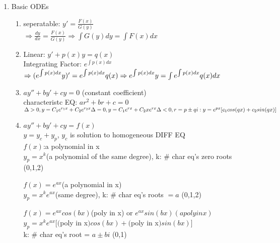 \documentclass[10pt]{article}
\begin{document}
  
\begin{multicols}{2}
	
\begin{enumerate}
	\item Basic ODEs
	\begin{enumerate}
		\item seperatable: $y'= \frac{F(x)}{G(y)}$\\
		$\Rightarrow \frac{dy}{dx} = \frac{F(x)}{G(y)} \Rightarrow \int G(y)dy = \int F(x)dx$
		
		\item Linear: $y'+p(x)y = q(x)$\\
		Integrating Factor: $e^{\int p(x)dx}$\\
		$\Rightarrow (e^{\int p(x)dx}y)' = e^{\int p(x)dx}q(x)\\ \Rightarrow
		e^{\int p(x)dx}y = \int e^{\int p(x)dx}q(x)dx$
		
		\item $ay'' + by' + cy = 0$ (constant coefficient)\\
		characteristc EQ: $ar^2 + br + c = 0$\\
		$\Delta > 0, y = C_1e^{r_1x} + C_2e^{r_2x}\\
		\Delta = 0, y = C_1e^{rx} + C_2xe^{rx}\\
		\Delta < 0, r = p \pm qi: y = e^{px}[c_1cos(qx)+c_2sin(qx)]$
		
		\item $ay'' + by' + cy = f(x)$ \\
		$y = y_c + y_p$, $y_c$ is solution to homogeneous DIFF EQ\\
		$f(x)$:a polynomial in x\\
		$y_p =  x^k$(a polynomial of the same degree), k: $\#$ char eq's zero roots (0,1,2)
		
		$f(x) = e^{ax}$(a polynomial in x)\\
		$y_p =  x^ke^{ax}$(same degree), k: $\#$ char eq's roots $= a$ (0,1,2)
		
		$f(x) = e^{ax}cos(bx)$(poly in x) or $e^{ax}sin(bx)(a poly in x)$\\
		$y_p = x^ke^{ax} [ ($poly in x$)cos(bx) + ($poly in x$)sin(bx) ]$\\
		k: $\#$ char eq's root = $a \pm bi$ (0,1)
	\end{enumerate}




\end{enumerate}
\end{multicols}
\end{document}
